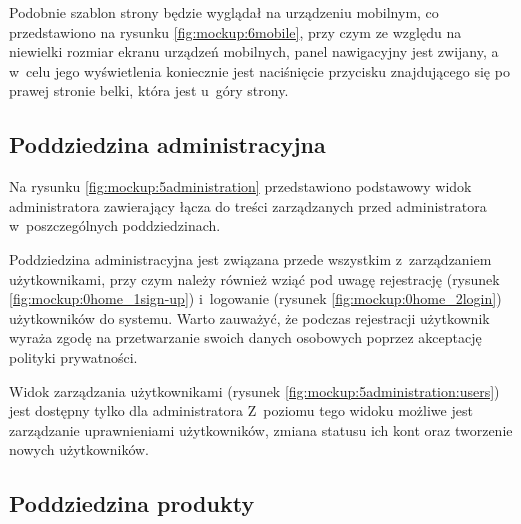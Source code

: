
Podobnie szablon strony będzie wyglądał na urządzeniu mobilnym, co przedstawiono na rysunku \ref{fig:mockup:6mobile},
przy czym ze względu na niewielki rozmiar ekranu urządzeń mobilnych, panel nawigacyjny jest zwijany,
a w~celu jego wyświetlenia koniecznie jest naciśnięcie przycisku znajdującego się po prawej stronie belki, która jest u~góry strony.


\subsection{Poddziedzina administracyjna}

Na rysunku \ref{fig:mockup:5administration} przedstawiono podstawowy widok administratora zawierający łącza do treści zarządzanych przed administratora w~poszczególnych poddziedzinach.


Poddziedzina administracyjna jest związana przede wszystkim z~zarządzaniem użytkownikami,
przy czym należy również wziąć pod uwagę rejestrację (rysunek \ref{fig:mockup:0home_1sign-up}) i~logowanie (rysunek \ref{fig:mockup:0home_2login}) użytkowników do systemu.
Warto zauważyć, że podczas rejestracji użytkownik wyraża zgodę na przetwarzanie swoich danych osobowych poprzez akceptację polityki prywatności.



Widok zarządzania użytkownikami (rysunek \ref{fig:mockup:5administration:users}) jest dostępny tylko dla administratora
Z~poziomu tego widoku możliwe jest zarządzanie uprawnieniami użytkowników, zmiana statusu ich kont oraz tworzenie nowych użytkowników.


\subsection{Poddziedzina produkty}

